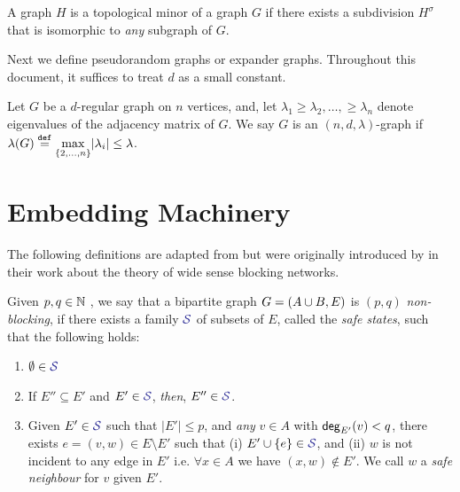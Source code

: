 \documentclass[11pt]{article}
\newcommand{\EnDeeLambda}{(n, d, \lambda)}
\newcommand{\Subdivision}[2]{{#1}^{#2}}
\newcommand{\ExpansionFactor}[1]{\lambda(#1)}
\begin{document}
\begin{definition}\label{def:topological-minor}
A graph $H$ is a topological minor of a graph $G$ if there exists a subdivision $\Subdivision{H}{\sigma}$ that is isomorphic to \emph{any} subgraph of $G$.	
\end{definition}

Next we define pseudorandom graphs or expander graphs. 
Throughout this document, it suffices to treat $d$ as a small constant.

\begin{definition}[$\EnDeeLambda$ pseudorandom graphs]\label{def:expander-graphs}
Let $G$ be a $d$-regular graph on $n$ vertices, and, let $\lambda_1 \geq \lambda_2, \dots, \geq \lambda_n$ denote eigenvalues of the adjacency matrix of $G$.
We say $G$ is an $\EnDeeLambda$-graph if $\ExpansionFactor{\Graph} \Def \underset{{\{2, \dots, n\}}}{\max}|\lambda_i| \leq \lambda$.
\end{definition}


\begin{lemma}\label{lemma:expanders-mixing-lemma}
	
\end{lemma}


\section{Embedding Machinery}

The following definitions are adapted from \citep{nenadov2023routing} but were originally introduced by \citet{feldman1988wide} in their work about the theory of wide sense blocking networks.

\begin{definition}
Given $p,q \in \mathbb{N}$ , we say that a bipartite graph $G = (A \cup B, E)$ is $(p, q)$ \emph{non-blocking}, if there exists a family $\Family{S}$ of subsets of $E$, called the \emph{safe states}, such that the following holds:

\begin{enumerate}
	\item $\emptyset \in \Family{S}$
	\item If $E'' \subseteq E'$ and $E' \in \Family{S}$, \emph{then}, $E'' \in \Family{S}$.
	\item Given $E' \in \Family{S}$ such that $|E'| \leq p$, and \emph{any} $v \in A$ with $\mathsf{deg}_{E'}(v) < q$, there exists $e = (v, w) \in E \setminus E'$  such that (i) $E' \cup \Set{e} \in \SafeStates $, and (ii) $w$ is not incident to any edge in $E'$ i.e. $\forall x \in A$ we have $(x,w) \notin E'$. 
 We call $w$ a \emph{safe neighbour} for $v$ given $E'$.
\end{enumerate}

\end{definition}
\end{document}
